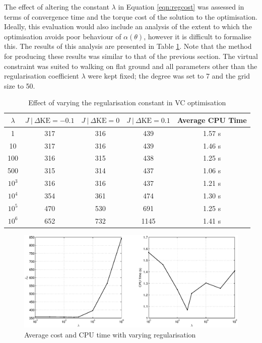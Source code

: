 The effect of altering the constant $\lambda$ in Equation \ref{eqn:regcost} was assessed in terms of convergence time and the torque cost of the solution to the optimisation. Ideally, this evaluation would also include an analysis of the extent to which the optimisation avoids poor behaviour of $\alpha(\theta)$, however it is difficult to formalise this. The results of this analysis are presented in Table \ref{tab:reg}. Note that the method for producing these results was similar to that of the previous section. The virtual constraint was suited to walking on flat ground and all parameters other than the regularisation coefficient $\lambda$ were kept fixed; the degree was set to 7 and the grid size to 50.

\begin{table}
	\centering
	\begin{tabular}{c || c | c |c || c}
		$\lambda$ & $J~|~{\Delta\mathrm{KE}=-0.1}$ & $J~|~{\Delta\mathrm{KE}=0}$ & $J~|~{\Delta\mathrm{KE}=0.1}$ & Average CPU Time \\ \hline
		 1        & 317 & 316 & 439  & 1.57 s \\
		 10       & 317 & 316 & 439  & 1.46 s \\
		 100      & 316 & 315 & 438  & 1.25 s \\
		 500      & 315 & 314 & 437  & 1.06 s \\
		 $10^3$   & 316 & 316 & 437  & 1.21 s \\
		 $10^4$   & 354 & 361 & 474  & 1.30 s \\
		 $10^5$   & 470 & 530 & 691  & 1.25 s \\
		 $10^6$   & 652 & 732 & 1145  & 1.41 s \\
	\end{tabular}
	\caption{Effect of varying the regularisation constant in VC optimisation}
	\label{tab:reg}
\end{table}

\begin{figure}
\centering
\includegraphics[width=\linewidth]{7Results/reg}
\caption{Average cost and CPU time with varying regularisation}
\label{fig:reg}
\end{figure}

